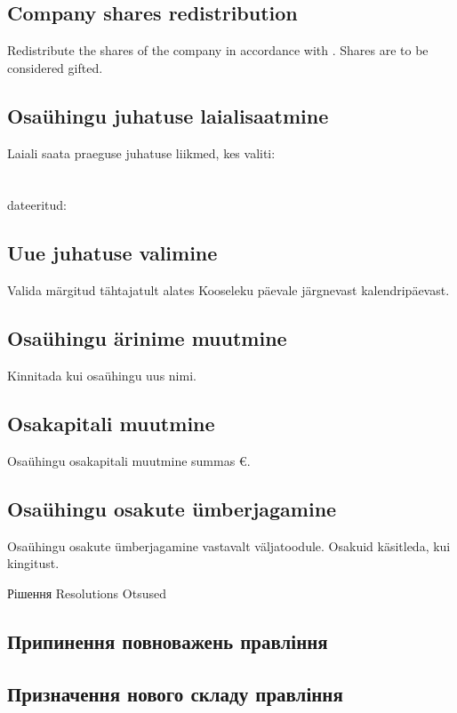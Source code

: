 \begin{Form}
\begin{paracol}{3}
{          \subsection{Company shares redistribution}
          Redistribute the shares of the company in accordance with . Shares are to be considered gifted.
        }
        { \subsection{Osaühingu juhatuse laialisaatmine}
          Laiali saata praeguse juhatuse liikmed, kes valiti:\\
          \\
          \\
          dateeritud:\\
          \subsection{Uue juhatuse valimine}
          Valida  märgitud  tähtajatult alates Kooseleku päevale järgnevast kalendripäevast.
          \subsection{Osaühingu ärinime muutmine}
          Kinnitada  kui osaühingu uus nimi.
          \subsection{Osakapitali muutmine}
          Osaühingu osakapitali muutmine summas  €.
          \subsection{Osaühingu osakute ümberjagamine}
          Osaühingu osakute ümberjagamine vastavalt  väljatoodule. Osakuid käsitleda, kui kingitust.
        }
      \multibreak
      \clause
        {Рішення}
        {Resolutions}
        {Otsused}
        { \subsection{Припинення повноважень правління}
          \subsection{Призначення нового складу правління}
}
\end{paracol}
\end{Form}
